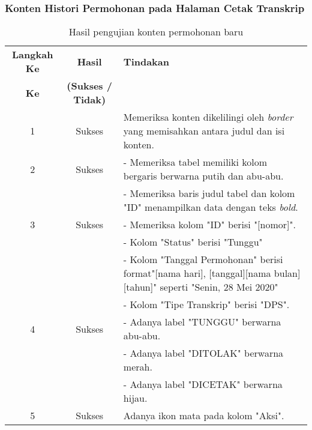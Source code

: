 \subsubsection{Konten Histori Permohonan pada Halaman Cetak Transkrip}
\begin{table}[H]
	\centering 
	\caption{Hasil pengujian konten permohonan baru}
	\label{hasil:HistoriPermohonan}
	\begin{tabular}{|c| c| p{}|}
		\toprule
		\textbf{Langkah Ke} & \textbf{Hasil} & \textbf{Tindakan}\\
		\textbf{Ke} & \textbf{(Sukses / Tidak)} &\\
		\midrule
		1&Sukses&Memeriksa konten dikelilingi oleh \textit{border} yang memisahkan antara judul dan isi konten.\\
		\hline
		2&Sukses&- Memeriksa tabel memiliki kolom bergaris berwarna putih dan abu-abu.\\
		&&- Memeriksa baris judul tabel dan kolom "ID" menampilkan data dengan teks \textit{bold}.\\
		\hline
		3&Sukses& - Memeriksa kolom "ID" berisi "[nomor]".\\
		&& - Kolom "Status" berisi "Tunggu" \\
		&& - Kolom "Tanggal Permohonan" berisi format"[nama hari], [tanggal][nama bulan][tahun]" seperti "Senin, 28 Mei 2020" \\
		&& - Kolom "Tipe Transkrip" berisi "DPS".\\
		\hline
		4&Sukses& - Adanya label "TUNGGU" berwarna abu-abu.\\
		&& - Adanya label "DITOLAK" berwarna merah.\\
		&& - Adanya label "DICETAK" berwarna hijau.\\
		\hline
		5&Sukses& Adanya ikon mata pada kolom "Aksi".\\
		
		\bottomrule		
	\end{tabular} 
\end{table}


